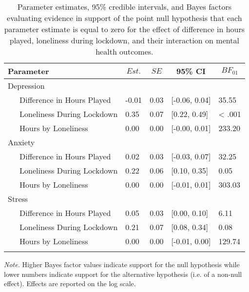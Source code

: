 \documentclass[
  english,
  man,floatsintext]{apa6}
\begin{document}
\begin{table}[!htbp]

\begin{center}
\begin{threeparttable}

\caption{\label{tab:study-two-mh-moderation}Parameter estimates, 95\% credible intervals, and Bayes factors evaluating evidence in support of the point null hypothesis that each parameter estimate is equal to zero for the effect of difference in hours played, loneliness during lockdown, and their interaction on mental health outcomes.}

\begin{tabular}{lllll}
\toprule
Parameter & \multicolumn{1}{c}{$Est.$} & \multicolumn{1}{c}{$SE$} & \multicolumn{1}{c}{95\% CI} & \multicolumn{1}{c}{$BF_{01}$}\\
\midrule
Depression &  &  &  & \\
\ \ \ Difference in Hours Played & -0.01 & 0.03 & {}[-0.06, 0.04] & 35.55\\
\ \ \ Loneliness During Lockdown & 0.35 & 0.07 & {}[0.22, 0.49] & < .001\\
\ \ \ Hours by Loneliness & 0.00 & 0.00 & {}[-0.00, 0.01] & 233.20\\
Anxiety &  &  &  & \\
\ \ \ Difference in Hours Played & 0.02 & 0.03 & {}[-0.03, 0.07] & 32.25\\
\ \ \ Loneliness During Lockdown & 0.22 & 0.06 & {}[0.10, 0.35] & 0.05\\
\ \ \ Hours by Loneliness & 0.00 & 0.00 & {}[-0.01, 0.01] & 303.03\\
Stress &  &  &  & \\
\ \ \ Difference in Hours Played & 0.05 & 0.03 & {}[0.00, 0.10] & 6.11\\
\ \ \ Loneliness During Lockdown & 0.21 & 0.07 & {}[0.08, 0.34] & 0.08\\
\ \ \ Hours by Loneliness & 0.00 & 0.00 & {}[-0.01, 0.00] & 129.74\\
\bottomrule
\addlinespace
\end{tabular}

\begin{tablenotes}[para]
\normalsize{\textit{Note.} Higher Bayes factor values indicate support for the null hypothesis while lower numbers indicate support for the alternative hypothesis (i.e. of a non-null effect). Effects are reported on the log scale.}
\end{tablenotes}

\end{threeparttable}
\end{center}

\end{table}
\end{document}
